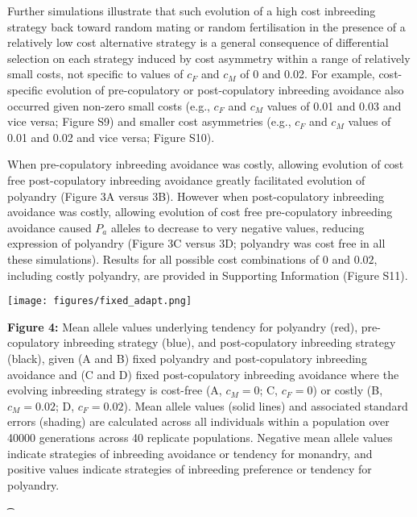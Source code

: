 \documentclass[10pt,letterpaper]{article}
\begin{document}
Further simulations illustrate that such evolution of a high cost inbreeding strategy back toward random mating or random fertilisation in the presence of a relatively low cost alternative strategy is a general consequence of differential selection on each strategy induced by cost asymmetry within a range of relatively small costs, not specific to values of $c_{F}$ and $c_{M}$ of 0 and 0.02. For example, cost-specific evolution of pre-copulatory or post-copulatory inbreeding avoidance also occurred given non-zero small costs (e.g., $c_{F}$ and $c_{M}$ values of 0.01 and 0.03 and vice versa; Figure S9) and smaller cost asymmetries (e.g., $c_{F}$ and $c_{M}$ values of 0.01 and 0.02 and vice versa; Figure S10).

When pre-copulatory inbreeding avoidance was costly, allowing evolution of cost free post-copulatory inbreeding avoidance greatly facilitated evolution of polyandry (Figure 3A versus 3B). However when post-copulatory inbreeding avoidance was costly, allowing evolution of cost free pre-copulatory inbreeding avoidance caused $P_{a}$ alleles to decrease to very negative values, reducing expression of polyandry (Figure 3C versus 3D; polyandry was cost free in all these simulations). Results for all possible cost combinations of $0$ and $0.02$, including costly polyandry, are provided in Supporting Information (Figure S11).

{\color{Gray}
\begin{adjustwidth}{-2.2in}{0in}
{%
   \texttt{[image: figures/fixed\_adapt.png]}%
}
{%
   \begin{justify}\vspace{0.25 mm} \textbf{Figure 4:} Mean allele values underlying tendency for polyandry (red), pre-copulatory inbreeding strategy (blue), and post-copulatory inbreeding strategy (black), given (A and B) fixed polyandry and post-copulatory inbreeding avoidance and (C and D) fixed post-copulatory inbreeding avoidance where the evolving inbreeding strategy is cost-free (A, $c_{M} = 0$; C, $c_{F} = 0$) or costly (B, $c_{M}=0.02$; D, $c_{F}=0.02$). Mean allele values (solid lines) and associated standard errors (shading) are calculated across all individuals within a population over 40000 generations across 40 replicate populations. Negative mean allele values indicate strategies of inbreeding avoidance or tendency for monandry, and positive values indicate strategies of inbreeding preference or tendency for polyandry. \end{justify}{\t}%
}
\end{adjustwidth}
}
\end{document}
